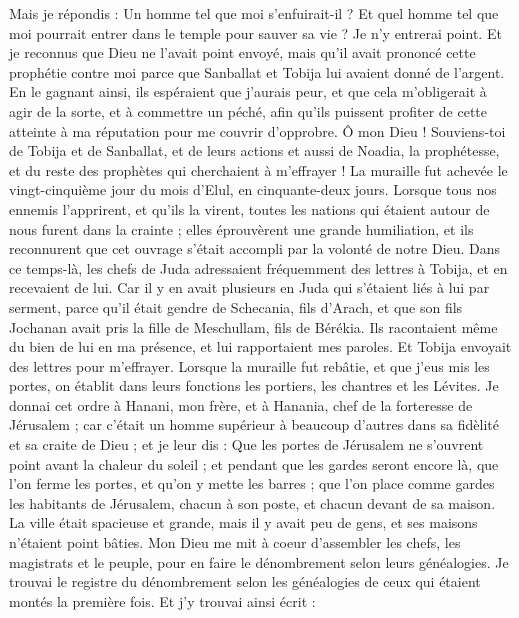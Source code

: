 \begin{multicols}{2}
Mais je répondis : Un homme tel que moi s'enfuirait-il ? Et quel homme tel que moi pourrait entrer dans le temple pour sauver sa vie ? Je n'y entrerai point.
Et je reconnus que Dieu ne l'avait point envoyé, mais qu'il avait prononcé cette prophétie contre moi parce que Sanballat et Tobija lui avaient donné de l'argent.
En le gagnant ainsi, ils espéraient que j'aurais peur, et que cela m’obligerait à agir de la sorte, et à commettre un péché, afin qu'ils puissent profiter de cette atteinte à ma réputation pour me couvrir d'opprobre.
Ô mon Dieu ! Souviens-toi de Tobija et de Sanballat, et de leurs actions et aussi de Noadia, la prophétesse, et du reste des prophètes qui cherchaient à m'effrayer !
La muraille fut achevée le vingt-cinquième jour du mois d'Elul, en cinquante-deux jours.
Lorsque tous nos ennemis l'apprirent, et qu’ils la virent, toutes les nations qui étaient autour de nous furent dans la crainte ; elles éprouvèrent une grande humiliation, et ils reconnurent que cet ouvrage s'était accompli par la volonté de notre Dieu.
Dans ce temps-là, les chefs de Juda adressaient fréquemment des lettres à Tobija, et en recevaient de lui.
Car il y en avait plusieurs en Juda qui s'étaient liés à lui par serment, parce qu'il était gendre de Schecania, fils d'Arach, et que son fils Jochanan avait pris la fille de Meschullam, fils de Bérékia.
Ils racontaient même du bien de lui en ma présence, et lui rapportaient mes paroles. Et Tobija envoyait des lettres pour m'effrayer.
\VerseOne{}Lorsque la muraille fut rebâtie, et que j'eus mis les portes, on établit dans leurs fonctions les portiers, les chantres et les Lévites.
Je donnai cet ordre à Hanani, mon frère, et à Hanania, chef de la forteresse de Jérusalem ; car c'était un homme supérieur à beaucoup d'autres dans sa fidèlité et sa craite de Dieu ;
et je leur dis : Que les portes de Jérusalem ne s'ouvrent point avant la chaleur du soleil ; et pendant que les gardes seront encore là, que l'on ferme les portes, et qu'on y mette les barres ; que l'on place comme gardes les habitants de Jérusalem, chacun à son poste, et chacun devant de sa maison.
La ville était spacieuse et grande, mais il y avait peu de gens, et ses maisons n'étaient point bâties.
Mon Dieu me mit à coeur d'assembler les chefs, les magistrats et le peuple, pour en faire le dénombrement selon leurs généalogies. Je trouvai le registre du dénombrement selon les généalogies de ceux qui étaient montés la première fois. Et j'y trouvai ainsi écrit :

\end{multicols}
